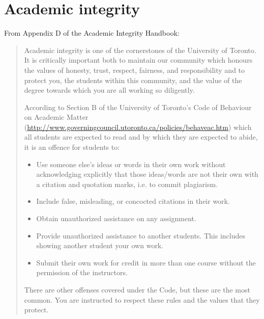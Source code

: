 \documentclass{article}
\begin{document}
\section*{Academic integrity}

From Appendix D of the Academic Integrity Handbook:
\begin{quote}
  Academic integrity is one of the cornerstones of the University of
  Toronto. It is critically important both to maintain our community
  which honours the values of honesty, trust, respect, fairness, and
  responsibility and to protect you, the students within this
  community, and the value of the degree towards which you are all
  working so diligently.  

  According to Section B of the University of
  Toronto's Code of Behaviour on Academic Matter
  (\url{http://www.governingcouncil.utoronto.ca/policies/behaveac.htm})
  which all students are expected to read and by which they are
  expected to abide, it is an offence for students to:
  \begin{itemize}
    \item Use someone else's ideas or words in their own work without
      acknowledging explicitly that those ideas/words are not their
      own with a citation and quotation marks, i.e. to commit
      plagiarism.
  \item Include false, misleading, or concocted citations in their
    work.
  \item Obtain unauthorized assistance on any assignment. 
  \item Provide unauthorized assistance to another students. This
    includes showing another student your own work.
  \item Submit their own work for credit in more than one course
      without the permission of the instructors.
  \end{itemize}

  There are other offenses covered under the Code, but these are the
  most common. You are instructed to respect these rules and the
  values that they protect.
\end{quote}
\end{document}
